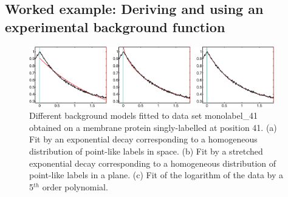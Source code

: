 \documentclass[11pt,a4paper]{article}
\begin{document}
\subsection{Worked example: Deriving and using an experimental background function}


\begin{figure}[ht]
 \vspace{10mm}
 	\begin{center}
		\includegraphics[width=0.95\textwidth]{figure14.pdf}
	\end{center}
	\caption{Different background models fitted to data set {\ttfamily monolabel\_41} obtained on a membrane protein singly-labelled at position 41.  (a) Fit by an exponential decay corresponding to a homogeneous distribution of point-like labels in space. (b) Fit by a stretched exponential decay corresponding to a homogeneous distribution of point-like labels in a plane. (c) Fit of the logarithm of the data by a 5$^{th}$ order polynomial.}
	\label{fig:14}
\end{figure}
\end{document}
